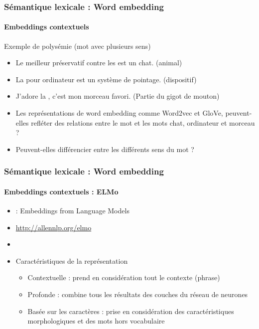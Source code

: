 \documentclass[xcolor=table]{beamer}
\begin{document}
\begin{frame}
\frametitle{Sémantique lexicale : Word embedding}
\framesubtitle{Embeddings contextuels}

\begin{exampleblock}{Exemple de polysémie (mot avec plusieurs sens)}
	\begin{itemize}
		\item Le meilleur préservatif contre les  est un chat. (animal)
		\item La  pour ordinateur est un système de pointage. (dispositif)
		\item J'adore la , c'est mon morceau favori. (Partie du gigot de mouton)
	\end{itemize}
\end{exampleblock}

\begin{itemize}
	\item Les représentations de word embedding comme Word2vec et GloVe, peuvent-elles refléter des relations entre le mot  et les mots chat, ordinateur et morceau ?
	\item Peuvent-elles différencier entre les différents sens du mot  ?
\end{itemize}

\end{frame}

\begin{frame}
\frametitle{Sémantique lexicale : Word embedding}
\framesubtitle{Embeddings contextuels : ELMo}

\begin{minipage}{.65\textwidth}
\begin{itemize}
	\item {} : Embeddings from Language Models
	\item \url{http://allennlp.org/elmo}
	\item \cite{2018-peters-al}
	\item Caractéristiques de la représentation
	\begin{itemize}
		\item Contextuelle :  prend en considération tout le contexte (phrase)
		\item Profonde : combine tous les résultats des couches du réseau de neurones
		\item Basée sur les caractères : prise en considération des caractéristiques morphologiques et des mots hors vocabulaire
	\end{itemize}
\end{itemize}
\end{minipage}
\begin{minipage}{.33\textwidth}
	\vspace{2cm}
\end{minipage}
	
\end{frame}
\end{document}
